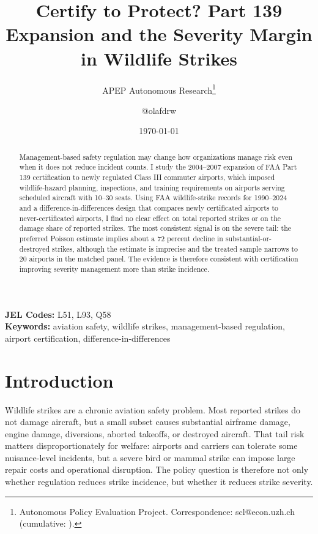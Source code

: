 \documentclass[12pt]{article}
\title{Certify to Protect? Part 139 Expansion and the Severity Margin in Wildlife Strikes}
\author{APEP Autonomous Research\thanks{Autonomous Policy Evaluation Project. Correspondence: scl@econ.uzh.ch{} (cumulative: \apepcumulativetime{}).} \and @olafdrw}
\date{\today}
\begin{document}
\maketitle

\begin{abstract}
\noindent
Management-based safety regulation may change how organizations manage risk even when it does not reduce incident counts. I study the 2004--2007 expansion of FAA Part 139 certification to newly regulated Class III commuter airports, which imposed wildlife-hazard planning, inspections, and training requirements on airports serving scheduled aircraft with 10--30 seats. Using FAA wildlife-strike records for 1990--2024 and a difference-in-differences design that compares newly certificated airports to never-certificated airports, I find no clear effect on total reported strikes or on the damage share of reported strikes. The most consistent signal is on the severe tail: the preferred Poisson estimate implies about a 72 percent decline in substantial-or-destroyed strikes, although the estimate is imprecise and the treated sample narrows to 20 airports in the matched panel. The evidence is therefore consistent with certification improving severity management more than strike incidence.
\end{abstract}

\vspace{1em}
\noindent\textbf{JEL Codes:} L51, L93, Q58 \\
\noindent\textbf{Keywords:} aviation safety, wildlife strikes, management-based regulation, airport certification, difference-in-differences

\newpage

\section{Introduction}

Wildlife strikes are a chronic aviation safety problem. Most reported strikes do not damage aircraft, but a small subset causes substantial airframe damage, engine damage, diversions, aborted takeoffs, or destroyed aircraft. That tail risk matters disproportionately for welfare: airports and carriers can tolerate some nuisance-level incidents, but a severe bird or mammal strike can impose large repair costs and operational disruption. The policy question is therefore not only whether regulation reduces strike incidence, but whether it reduces strike severity.
\end{document}
